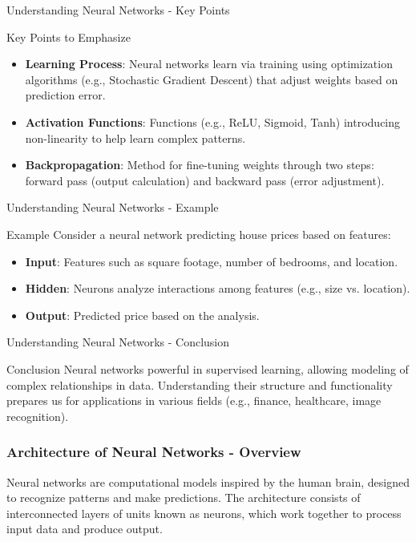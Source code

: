 \documentclass[aspectratio=169]{beamer}
\begin{document}
\begin{frame}[fragile]{Understanding Neural Networks - Key Points}
    \begin{block}{Key Points to Emphasize}
        \begin{itemize}
            \item \textbf{Learning Process}: Neural networks learn via training using optimization algorithms (e.g., Stochastic Gradient Descent) that adjust weights based on prediction error.
            \item \textbf{Activation Functions}: Functions (e.g., ReLU, Sigmoid, Tanh) introducing non-linearity to help learn complex patterns.
            \item \textbf{Backpropagation}: Method for fine-tuning weights through two steps: forward pass (output calculation) and backward pass (error adjustment).
        \end{itemize}
    \end{block}
\end{frame}

\begin{frame}[fragile]{Understanding Neural Networks - Example}
    \begin{block}{Example}
        Consider a neural network predicting house prices based on features:
    \end{block}
    \begin{itemize}
        \item \textbf{Input}: Features such as square footage, number of bedrooms, and location.
        \item \textbf{Hidden}: Neurons analyze interactions among features (e.g., size vs. location).
        \item \textbf{Output}: Predicted price based on the analysis.
    \end{itemize}
\end{frame}

\begin{frame}[fragile]{Understanding Neural Networks - Conclusion}
    \begin{block}{Conclusion}
        Neural networks powerful in supervised learning, allowing modeling of complex relationships in data. Understanding their structure and functionality prepares us for applications in various fields (e.g., finance, healthcare, image recognition).
    \end{block}
\end{frame}

\begin{frame}[fragile]
    \frametitle{Architecture of Neural Networks - Overview}
    Neural networks are computational models inspired by the human brain, designed to recognize patterns and make predictions. The architecture consists of interconnected layers of units known as neurons, which work together to process input data and produce output.
\end{frame}
\end{document}
